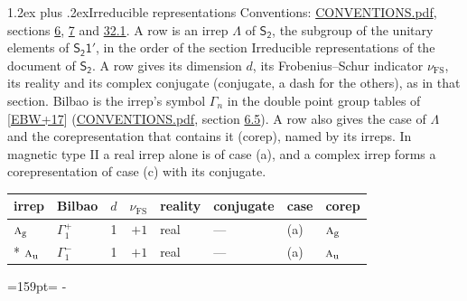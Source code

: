 \documentclass[10pt,a4paper]{article}
\makeatletter
\renewcommand\section{\@startsection{section}{1}{\z@}{-3ex plus -1ex minus -.2ex}%
  {1.2ex plus .2ex}{\normalfont\large\sffamily\bfseries\color{parttitle}}}
\newcommand{\needspace}[1]{\par\penalty-100\begingroup\dimen0=#1\relax\dimen2=\pagegoal
  \advance\dimen2-\pagetotal\ifdim\dimen0>\dimen2\relax\ifdim\dimen2>0pt\vfil\break\fi\fi
  \endgroup}
\numberwithin{equation}{section}
\newcommand{\grp}[1]{\mathsf{#1}}
\newcommand{\irr}[1]{\text{\normalfont\scshape #1}}
\newcommand{\ptag}[1]{\mathrm{#1}}
\newcommand{\fsind}{\nu_{\mathrm{FS}}}
\makeatother
\begin{document}
\section{Irreducible representations}\label{s:irreps}
Conventions: \href{../../CONVENTIONS.pdf}{CONVENTIONS.pdf}, sections \href{../../../rotation/CONVENTIONS.pdf\#conv.6}{6}, \href{../../../rotation/CONVENTIONS.pdf\#conv.7}{7} and \href{../../CONVENTIONS.pdf\#conv.32.1}{32.1}.
\leavevmode\label{n:irrep.Delta}A row is an irrep $\Lambda$ of $\grp{S_{2}}$, the subgroup of the unitary elements of $\grp{S_{2}1'}$, in the order of the section Irreducible representations of the document of \href{../../../rotation/data/pdf/S2.pdf}{$\grp{S_{2}}$}. \label{n:index.dimension}\label{n:index.frobenius}\label{n:head.irrep}\label{n:head.reality}\label{n:head.conjugate}A row gives its dimension $d$, its Frobenius--Schur indicator $\fsind$, its reality and its complex conjugate (conjugate, a dash for the others), as in that section. \label{n:head.bilbao}\label{n:irrep.alias.gamma}Bilbao is the irrep's symbol $\Gamma_n$ in the double point group tables of [\href{../../../REFERENCES.pdf\#ref.EBW+17}{EBW+17}] (\href{../../CONVENTIONS.pdf}{CONVENTIONS.pdf}, section \href{../../../rotation/CONVENTIONS.pdf\#conv.6.5}{6.5}). \label{n:head.case.corep}\label{n:head.corep}A row also gives the case of $\Lambda$ and the corepresentation that contains it (corep), named by its irreps. In magnetic type II a real irrep alone is of case (a), and a complex irrep forms a corepresentation of case (c) with its conjugate.
\setlength{\emergencystretch}{2em}\par\setlength{\emergencystretch}{0pt}
{\small\renewcommand{\arraystretch}{1.25}\setlength{\tabcolsep}{4pt}\begin{longtable}{@{}llrrllll@{}}\toprule
irrep & Bilbao & $d$ & $\fsind$ & reality & conjugate & case & corep\\\midrule\endhead
\bottomrule\endfoot\endlastfoot
$\irr{a}_{\ptag{g}}$ & $\Gamma_{1}^{+}$ & 1 & $+1$ & real & --- & (a) & $\irr{a}_{\ptag{g}}$\\*
$\irr{a}_{\ptag{u}}$ & $\Gamma_{1}^{-}$ & 1 & $+1$ & real & --- & (a) & $\irr{a}_{\ptag{u}}$\\
\bottomrule\end{longtable}}
\needspace{159pt}
\end{document}
